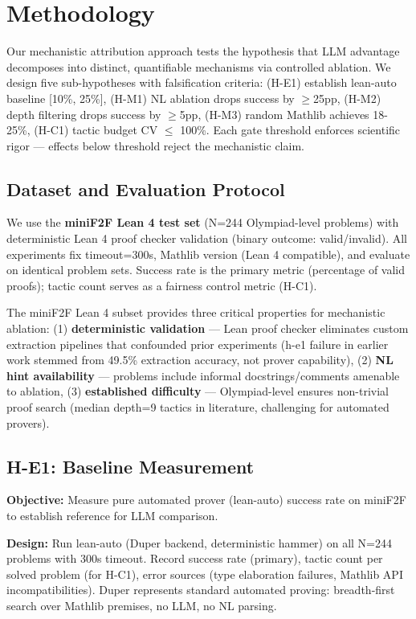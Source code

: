\section{Methodology}

Our mechanistic attribution approach tests the hypothesis that LLM advantage decomposes into distinct, quantifiable mechanisms via controlled ablation. We design five sub-hypotheses with falsification criteria: (H-E1) establish lean-auto baseline [10\%, 25\%], (H-M1) NL ablation drops success by $\geq$25pp, (H-M2) depth filtering drops success by $\geq$5pp, (H-M3) random Mathlib achieves 18-25\%, (H-C1) tactic budget CV $\leq$ 100\%. Each gate threshold enforces scientific rigor --- effects below threshold reject the mechanistic claim.

\subsection{Dataset and Evaluation Protocol}

We use the \textbf{miniF2F Lean 4 test set} (N=244 Olympiad-level problems) with deterministic Lean 4 proof checker validation (binary outcome: valid/invalid). All experiments fix timeout=300s, Mathlib version (Lean 4 compatible), and evaluate on identical problem sets. Success rate is the primary metric (percentage of valid proofs); tactic count serves as a fairness control metric (H-C1).

The miniF2F Lean 4 subset provides three critical properties for mechanistic ablation: (1) \textbf{deterministic validation} --- Lean proof checker eliminates custom extraction pipelines that confounded prior experiments (h-e1 failure in earlier work stemmed from 49.5\% extraction accuracy, not prover capability), (2) \textbf{NL hint availability} --- problems include informal docstrings/comments amenable to ablation, (3) \textbf{established difficulty} --- Olympiad-level ensures non-trivial proof search (median depth=9 tactics in literature, challenging for automated provers).

\subsection{H-E1: Baseline Measurement}

\textbf{Objective:} Measure pure automated prover (lean-auto) success rate on miniF2F to establish reference for LLM comparison.

\textbf{Design:} Run lean-auto (Duper backend, deterministic hammer) on all N=244 problems with 300s timeout. Record success rate (primary), tactic count per solved problem (for H-C1), error sources (type elaboration failures, Mathlib API incompatibilities). Duper represents standard automated proving: breadth-first search over Mathlib premises, no LLM, no NL parsing.

